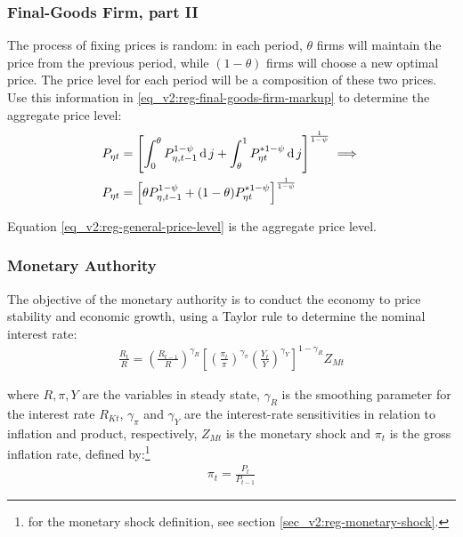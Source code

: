 \documentclass[../thesis.tex]{subfiles}
\begin{document}
\subsubsection*{Final-Goods Firm, part II}

The process of fixing prices is random: in each period, $\theta$ firms will maintain the price from the previous period, while $(1-\theta)$ firms will choose a new optimal price. The price level for each period will be a composition of these two prices. Use this information in \ref{eq_v2:reg-final-goods-firm-markup} to determine the aggregate price level:
\begin{align}
	P_{\eta t} & = \left[ \int_{0}^{\theta} P_{\eta, t-1}^{1-\psi} \operatorname{d} j + \int_{\theta}^{1} P_{\eta t}^{\ast 1-\psi} \operatorname{d} j \right]^{\frac{1}{1-\psi}}  \implies \nonumber \\
	P_{\eta t} & = \left[ \theta P_{\eta, t-1}^{1-\psi} + (1-\theta) P_{\eta t}^{\ast 1-\psi} \right]^\frac{1}{1-\psi} \label{eq_v2:reg-general-price-level}
\end{align}

Equation \ref{eq_v2:reg-general-price-level} is the aggregate price level.


\subsubsection{Monetary Authority}

The objective of the monetary authority is to conduct the economy to price stability and economic growth, using a Taylor rule \cite{taylor_discretion_1993} to determine the nominal interest rate:
\begin{align}
	\label{eq_v2:reg-monetary-policy}
	\frac{R_{t}}{R} =
	\left( \frac{R_{t-1}}{R} \right)^{\gamma_R}  \left[
	\left( \frac{\pi_t}{\pi} \right)^{\gamma_\pi}
	\left( \frac{Y_{t}}{Y} \right)^{\gamma_Y} \right]^{1-\gamma_R} Z_{Mt}
\end{align}

where $R, \pi, Y$ are the variables in steady state, $\gamma_R$ is the smoothing parameter for the interest rate $R_{Kt}$, $\gamma_\pi$ and $\gamma_Y$ are the interest-rate sensitivities in relation to inflation and product, respectively, $Z_{Mt}$ is the monetary shock and $\pi_t$ is the gross inflation rate, defined by:\footnote{for the monetary shock definition, see section \ref{sec_v2:reg-monetary-shock}.}
\begin{align}
	\pi_t = \frac{P_t}{P_{t-1}}
	\label{eq_v2:reg-gross-inflation-rate}
\end{align}
\end{document}
